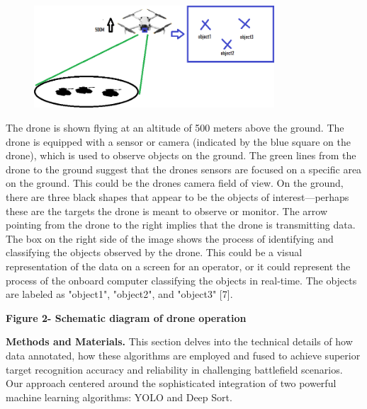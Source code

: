 \begin{figure}[H]
	\centering
	\includegraphics[width=0.8\textwidth]{assets/12}
	\caption*{}
\end{figure}The
drone is shown flying at an altitude of 500 meters above the ground. The
drone is equipped with a sensor or camera (indicated by the blue square
on the drone), which is used to observe objects on the ground. The green
lines from the drone to the ground suggest that the
drone\textquotesingle s sensors are focused on a specific area on the
ground. This could be the drone\textquotesingle s camera field of view.
On the ground, there are three black shapes that appear to be the
objects of interest---perhaps these are the targets the drone is meant
to observe or monitor. The arrow pointing from the drone to the right
implies that the drone is transmitting data. The box on the right side
of the image shows the process of identifying and classifying the
objects observed by the drone. This could be a visual representation of
the data on a screen for an operator, or it could represent the process
of the onboard computer classifying the objects in real-time. The
objects are labeled as "object1", "object2", and "object3" {[}7{]}.

\textbf{Figure 2- Schematic diagram of drone operation}

\textbf{Methods and Materials.} This section delves into the technical
details of how data annotated, how these algorithms are employed and
fused to achieve superior target recognition accuracy and reliability in
challenging battlefield scenarios. Our approach centered around the
sophisticated integration of two powerful machine learning algorithms:
YOLO and Deep Sort.

